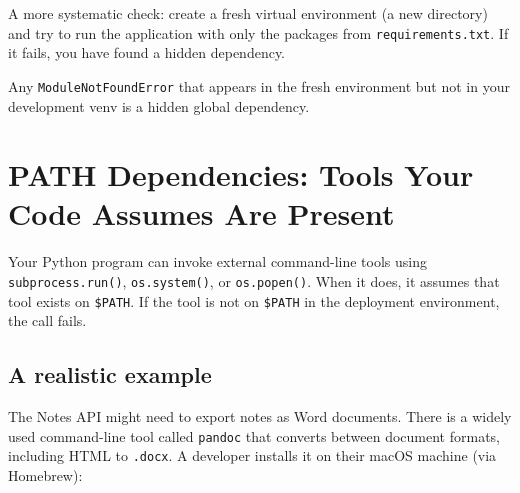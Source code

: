 A more systematic check: create a fresh virtual environment (a new directory) and try to run the application with only the packages from \texttt{requirements.txt}. If it fails, you have found a hidden dependency.

\begin{codebox}[short]

\begin{Shaded}
\begin{Highlighting}[]
 
\end{Highlighting}
\end{Shaded}

\end{codebox}

\noindent{}Any \texttt{ModuleNotFoundError} that appears in the fresh environment but not in your development venv is a hidden global dependency.

\setcounter{section}{1}
\section{PATH Dependencies: Tools Your Code Assumes Are Present}\label{08-hidden-dependencies:82-path-dependencies-tools-your-code-assumes-are-present}

Your Python program can invoke external command-line tools using \texttt{subprocess.run()}, \texttt{os.system()}, or \texttt{os.popen()}. When it does, it assumes that tool exists on \texttt{\$PATH}. If the tool is not on \texttt{\$PATH} in the deployment environment, the call fails.

\subsection*{A realistic example}\label{08-hidden-dependencies:a-realistic-example}

The Notes API might need to export notes as Word documents. There is a widely used command-line tool called \texttt{pandoc} that converts between document formats, including HTML to \texttt{.docx}. A developer installs it on their macOS machine (via Homebrew):

\begin{codebox}[short]

\begin{Shaded}
\begin{Highlighting}[]
\end{Highlighting}
\end{Shaded}

\end{codebox}

